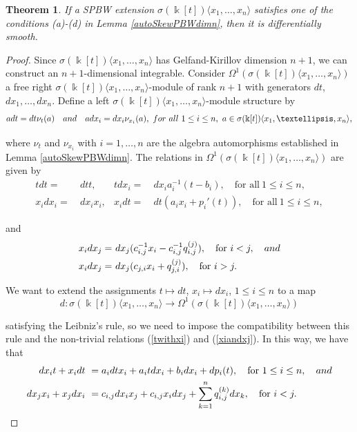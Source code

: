 \documentclass{amsart}
\newtheorem{theorem}{Theorem}[section]
\theoremstyle{definition}
\theoremstyle{remark}
\numberwithin{equation}{section}
\begin{document}
\begin{theorem}\label{smoothPBWn}
If a SPBW extension $\sigma(\Bbbk[t])\langle x_1,\ldots, x_n\rangle$ satisfies one of the conditions {\rm (a)}-{\rm (d)} in Lemma \ref{autoSkewPBWdimn}, then it is differentially smooth.
\end{theorem}
\begin{proof}
Since $\sigma(\Bbbk[t])\langle x_1,\ldots, x_n\rangle$ has Gelfand-Kirillov dimension $n+1$, we can construct an $n+1$-dimensional integrable. Consider $\Omega^{1}(\sigma(\Bbbk[t])\langle x_1,\ldots, x_n\rangle)$ a free right $\sigma(\Bbbk[t])\langle x_1,\ldots, x_n\rangle$-module of rank $n+1$ with generators $dt$, $dx_1, \ldots, dx_n$. Define a left $\sigma(\Bbbk[t])\langle x_1,\ldots, x_n\rangle$-module structure by
\begin{equation}\label{relrightmodn}
        adt = dt \nu_t(a) \quad {\rm and} \quad adx_i = dx_i\nu_{x_i}(a),  \ {\rm for\ all}\ 1\leq i \leq n, \ a\in \sigma(\Bbbk[t])\langle x_1,\ldots, x_n\rangle,
\end{equation}
    
where $\nu_t$ and $\nu_{x_i}$ with $i = 1, \dotsc, n$ are the algebra automorphisms established in Lemma \ref{autoSkewPBWdimn}. The relations in $\Omega^{1}(\sigma(\Bbbk[t])\langle x_1,\ldots, x_n\rangle)$ are given by
\begin{align}
    tdt = &\ dt t, & tdx_i = &\ dx_ia_i^{-1}(t-b_i), \quad \text{for all}\ 1\leq i \leq n, \label{rel1n}  \\
    x_idx_i = &\ dx_ix_i, & x_idt = &\ dt(a_ix_i+p_i'(t)), \quad \text{for all}\ 1\leq i \leq n,  \label{rel2n}  
\end{align}

and 
\begin{align}
x_idx_j = &\ dx_j(c_{i,j}^{-1}x_i-c_{i,j}^{-1}q_{i,j}^{(j)}), \quad \text{for}\ i < j, \quad {\rm and} \\
x_idx_j = &\ dx_j(c_{j,i}x_i + q_{j,i}^{(j)}), \quad \text{for}\ i > j. \label{rel3n} 
\end{align}

We want to extend the assignments $t\mapsto dt$, $x_i\mapsto dx_i$, $1\leq i \leq n$ to a map 
\[
d: \sigma(\Bbbk[t])\langle x_1,\ldots, x_n\rangle \to \Omega^{1}(\sigma(\Bbbk[t])\langle x_1,\ldots, x_n\rangle)
\]

satisfying the Leibniz's rule, so we need to impose the compatibility between this rule and the non-trivial relations {\rm (}\ref{twithxi}{\rm )} and {\rm (}\ref{xiandxj}{\rm )}. In this way, we have that
\begin{align*}
dx_it+x_idt &\ = a_idtx_i+a_itdx_i+b_idx_i+dp_i(t), \quad \text{for}\ 1\leq i \leq n, \quad {\rm and}\\
dx_jx_i+x_jdx_i &\ = c_{i,j}dx_ix_j+c_{i,j}x_idx_j +\sum_{k=1}^{n}q_{i,j}^{(k)}dx_k, \quad \text{for}\ i<j.
\end{align*}
    

\end{proof}
\end{document}

